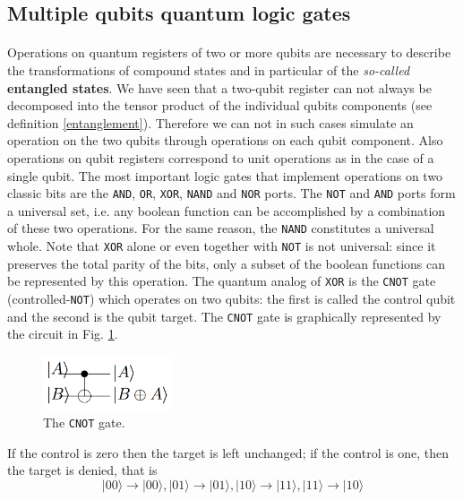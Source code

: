 \documentclass[a4paper,10pt]{article}
\begin{document}
\subsection{Multiple qubits quantum logic gates}

\paragraph{} Operations on quantum registers of two or more qubits are necessary to describe the transformations of compound states and in particular of the \textit{so-called} \textbf{entangled states}. We have seen that a two-qubit register can not always be decomposed into the tensor product of the individual qubits components (see definition \ref{entanglement}). Therefore we can not in such cases simulate an operation on the two qubits through operations on each qubit component. Also operations on qubit registers correspond to unit operations as in the case of a single qubit.
The most important logic gates that implement operations on two classic bits are the \texttt{AND}, \texttt{OR}, \texttt{XOR}, \texttt{NAND} and \texttt{NOR} ports. The \texttt{NOT} and \texttt{AND} ports form a universal set, i.e. any boolean function can be accomplished by a combination of these two operations. For the same reason, the \texttt{NAND} constitutes a universal whole. Note that \texttt{XOR} alone or even together with \texttt{NOT} is not universal: since it preserves the total parity of the bits, only a subset of the boolean functions can be represented by this operation.
The quantum analog of \texttt{XOR} is the \texttt{CNOT} gate (controlled-\texttt{NOT}) which operates on two qubits: the first is called the control qubit and the second is the qubit target. The \texttt{CNOT} gate is graphically represented by the circuit in Fig. \ref{cnot}.
\begin{figure}[!htb]
\begin{center}
\includegraphics[width=1.5in]{images/cnot.png}
\caption{The \texttt{CNOT} gate.}
\label{cnot}
\end{center}
\end{figure}

If the control is zero then the target is left unchanged; if the control is one, then the target is denied, that is
$$|00\rangle \rightarrow{} |00\rangle, |01\rangle \rightarrow{} |01\rangle, |10\rangle \rightarrow{} |11\rangle, |11\rangle \rightarrow{} |10\rangle$$
\end{document}
